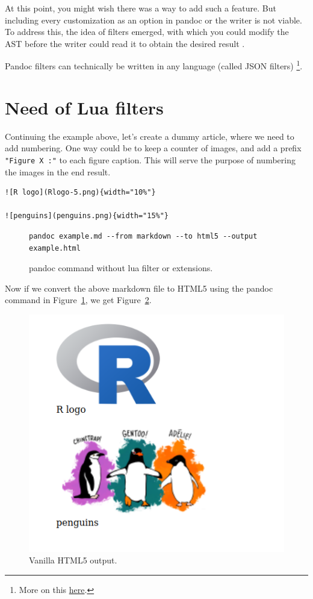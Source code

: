 At this point, you might wish there was a way to add such a feature. But including every customization as an option in pandoc or the writer is not viable. 
To address this, the idea of filters emerged, with which you could modify the AST before the writer could read it to obtain the desired result \citep{pandocfilters}.

Pandoc filters can technically be written in any language (called JSON filters) \footnote{More on this \href{https://pandoc.org/filters.html}{here}.}.
\section{Need of Lua filters}

Continuing the example above, let's create a dummy article, where we need to add
numbering. One way could be to keep a counter of images, and add a prefix \verb|"Figure X :"|
to each figure caption. This will serve the purpose of numbering the images in the end result.

\begin{verbatim}
![R logo](Rlogo-5.png){width="10%"}

![penguins](penguins.png){width="15%"}

\end{verbatim}

\begin{figure}[htbp]
\begin{verbatim}
pandoc example.md --from markdown --to html5 --output example.html
\end{verbatim}
\caption{pandoc command without lua filter or extensions.}
\label{code:2}
\end{figure}

Now if we convert the above markdown file to HTML5 using the pandoc command in Figure~\ref{code:2}, we get Figure~\ref{fig:1}.


\begin{figure}[!htbp]
\centering
\includegraphics[width=0.5\linewidth]{figures/example.png}
\caption{Vanilla HTML5 output.}
\label{fig:1}
\end{figure}


